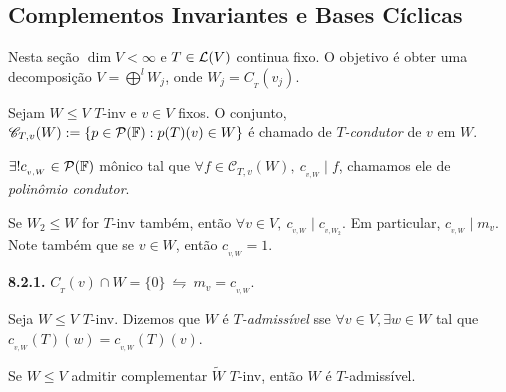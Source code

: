 
\subsection{Complementos Invariantes e Bases Cíclicas}

Nesta seção \(\dim V < \infty\) e \(T \in \mathcal{L}(V)\) continua fixo.  O objetivo é obter uma decomposição \(V = \bigoplus^l W_j\), onde \(W_j = C_{_{T}}(v_j)\).  

\begin{definition}
    Sejam \(W\leq V\) \(T\)-inv e \(v \in V\) fixos. O conjunto, \(\mathscr{C}_{{T,v}}(W) := \{p \in \mathcal{P}(\mathbb{F}) : p(T)(v) \in W\}\) é chamado de \(T\)\emph{-condutor} de \(v\) em \(W\). 
\end{definition}

\begin{exercise}
    \(\exists ! c_{_{v,W}} \in \mathcal{P}(\mathbb{F}) \) mônico tal que \(\forall f \in \mathscr{C}_{{T,v}}(W), \ c_{_{v,W}} \mid f\), chamamos ele de \emph{polinômio condutor}.
\end{exercise}

\begin{note}
    Se \(W_2 \leq  W\) for \(T\)-inv também, então \(\forall v \in V, \ c_{_{v,W}} \mid c_{_{v,W_2}}\). Em particular, \(c_{_{v,W}} \mid m_v\). Note também que se \(v \in W\), então \(c_{_{v,W}} = 1\).    
\end{note}

\begin{lemma}
    \textbf{8.2.1.} \(C_{_T}(v) \cap W = \{0\} \ \leftrightharpoons \ m_v = c_{_{v,W}}\). 
\end{lemma}

\begin{definition}
    Seja \(W\leq V\) \(T\)-inv. Dizemos que \(W\) é \(T\)\emph{-admissível} sse \(\forall v \in V, \exists w \in W\) tal que \(c_{_{v,W}}(T)(w) = c_{_{v,W}}(T)(v)\).  
\end{definition}

\begin{lemma}
    Se \(W\leq V\) admitir complementar \(\widetilde{W}\) \(T\)-inv, então \(W\) é \(T\)-admissível. 
\end{lemma}


